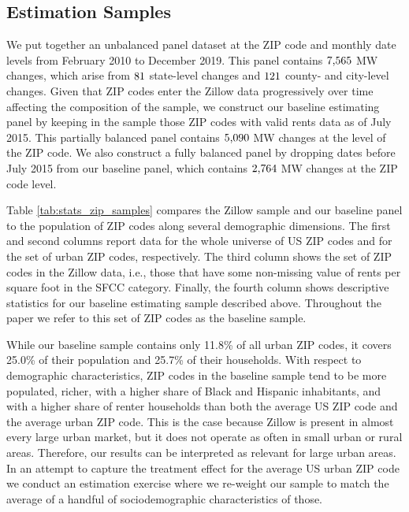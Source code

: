 \subsection{Estimation Samples}\label{sec:data_final_panel}

We put together an unbalanced panel dataset at the ZIP code and monthly date 
levels from February 2010 to December 2019.
This panel contains $\textnormal{7,565}$ MW changes, which arise from 
$\textnormal{81}$ state-level changes and $\textnormal{121}$ 
county- and city-level changes.
Given that ZIP codes enter the Zillow data progressively over time affecting 
the composition of the sample,
we construct our baseline estimating panel by keeping in the sample those ZIP 
codes with valid rents data as of July 2015.
This partially balanced panel contains $\textnormal{5,090}$ MW changes
at the level of the ZIP code.
We also construct a fully balanced panel by dropping dates before July 2015 
from our baseline panel, which contains $\textnormal{2,764}$ MW changes at the 
ZIP code level.

Table \ref{tab:stats_zip_samples} compares the Zillow sample and our baseline 
panel to the population of ZIP codes along several demographic dimensions. 
The first and second columns report data for the whole universe of US ZIP codes 
and for the set of urban ZIP codes, respectively.
The third column shows the set of ZIP codes in the Zillow data, i.e., those 
that have some non-missing value of rents per square foot in the SFCC category.
Finally, the fourth column shows descriptive statistics for our baseline 
estimating sample described above.
Throughout the paper we refer to this set of ZIP codes as the baseline sample.

While our baseline sample contains only 11.8\% of all urban ZIP codes, it covers
25.0\% of their population and 25.7\% of their households.
With respect to demographic characteristics, ZIP codes in the baseline sample 
tend to be more populated, richer, with a higher share of Black and Hispanic 
inhabitants, and with a higher share of renter households than both the average
US ZIP code and the average urban ZIP code.
This is the case because Zillow is present in almost every large urban market, 
but it does not operate as often in small urban or rural areas.
Therefore, our results can be interpreted as relevant for large urban areas.
In an attempt to capture the treatment effect for the average US urban ZIP code 
we conduct an estimation exercise where we re-weight our sample to match the 
average of a handful of sociodemographic characteristics of those.


